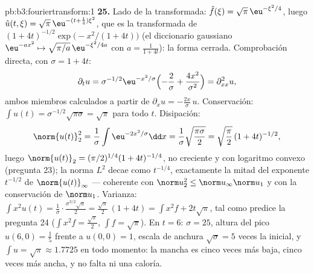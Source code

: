 \begin{solution}{pb:b3:fouriertransform:1}
\textbf{25.} Lado de la transformada: $\hat f(\xi) =
\sqrt\pi\,\eu^{-\xi^2/4}$, luego $\hat u(t,\xi) =
\sqrt\pi\,\eu^{-(t + \frac14)\xi^2}$, que es la transformada de
$(1 + 4t)^{-1/2}\exp\bigl(-x^2/(1+4t)\bigr)$ (el diccionario gaussiano
$\eu^{-ax^2} \mapsto
\sqrt{\pi/a}\,\eu^{-\xi^2/4a}$ con $a = \frac1{1+4t}$): la forma
cerrada. Comprobación directa, con $\sigma = 1 + 4t$:
\[
\partial_tu = \sigma^{-1/2}\eu^{-x^2/\sigma}
\Bigl(-\frac2\sigma + \frac{4x^2}{\sigma^2}\Bigr)
= \partial^2_{xx}u ,
\]
ambos miembros calculados a partir de $\partial_xu =
-\frac{2x}\sigma\,u$. Conservación: $\int u(t) =
\sigma^{-1/2}\sqrt{\pi\sigma} = \sqrt\pi$ para todo $t$. Disipación:
\[
\norm{u(t)}_2^2 = \frac1\sigma\int\eu^{-2x^2/\sigma}\dd x
= \frac1\sigma\sqrt{\frac{\pi\sigma}2}
= \sqrt{\frac\pi2}\,(1+4t)^{-1/2},
\]
luego $\norm{u(t)}_2 = (\pi/2)^{1/4}(1+4t)^{-1/4}$, no creciente y con
logaritmo convexo (pregunta 23); la norma $L^2$ decae como $t^{-1/4}$,
exactamente la mitad del exponente $t^{-1/2}$ de $\norm{u(t)}_\infty$
--- coherente con $\norm u_2^2 \leq \norm u_\infty\norm u_1$ y con la
conservación de $\norm u_1$. Varianza: $\int x^2u(t) =
\frac1\sigma\cdot\frac{\sigma^{3/2}\sqrt\pi}2 =
\frac{\sqrt\pi}2\,(1 + 4t) = \int x^2f + 2t\sqrt\pi$, tal como predice
la pregunta 24 ($\int x^2f = \frac{\sqrt\pi}2$, $\int
f = \sqrt\pi$). En $t = 6$: $\sigma = 25$, altura del pico
$u(6, 0) = \frac15$ frente a $u(0,0) = 1$, escala de anchura
$\sqrt\sigma = 5$ veces la inicial, y $\int u =
\sqrt\pi \approx 1.7725$ en todo momento: la mancha es cinco veces más
baja, cinco veces más ancha, y no falta ni una caloría.
\end{solution}
